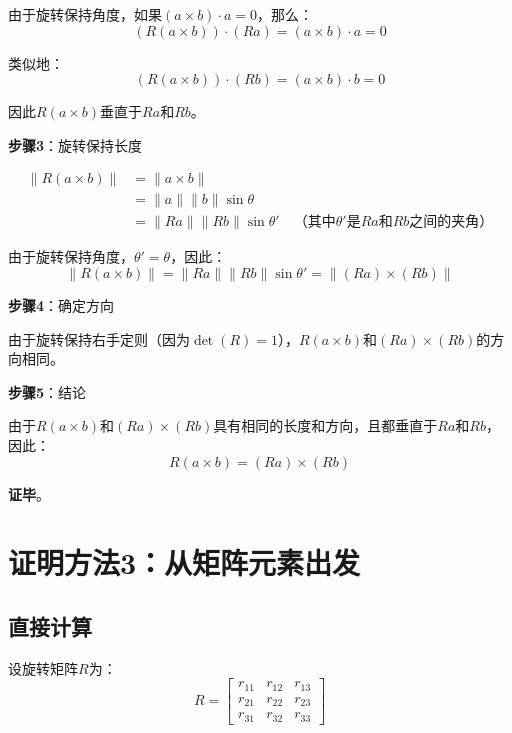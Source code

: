 \documentclass[12pt,a4paper]{article}
\begin{document}
由于旋转保持角度，如果$(a \times b) \cdot a = 0$，那么：
\begin{equation}
(R(a \times b)) \cdot (Ra) = (a \times b) \cdot a = 0
\end{equation}

类似地：
\begin{equation}
(R(a \times b)) \cdot (Rb) = (a \times b) \cdot b = 0
\end{equation}

因此$R(a \times b)$垂直于$Ra$和$Rb$。

\textbf{步骤3}：旋转保持长度

\begin{align}
\|R(a \times b)\| &= \|a \times b\| \\
&= \|a\| \|b\| \sin\theta \\
&= \|Ra\| \|Rb\| \sin\theta' \quad \text{（其中$\theta'$是$Ra$和$Rb$之间的夹角）}
\end{align}

由于旋转保持角度，$\theta' = \theta$，因此：
\begin{equation}
\|R(a \times b)\| = \|Ra\| \|Rb\| \sin\theta' = \|(Ra) \times (Rb)\|
\end{equation}

\textbf{步骤4}：确定方向

由于旋转保持右手定则（因为$\det(R) = 1$），$R(a \times b)$和$(Ra) \times (Rb)$的方向相同。

\textbf{步骤5}：结论

由于$R(a \times b)$和$(Ra) \times (Rb)$具有相同的长度和方向，且都垂直于$Ra$和$Rb$，因此：
\begin{equation}
R(a \times b) = (Ra) \times (Rb)
\end{equation}

\textbf{证毕}。

\section{证明方法3：从矩阵元素出发}

\subsection{直接计算}

设旋转矩阵$R$为：
\begin{equation}
R = \begin{bmatrix}
r_{11} & r_{12} & r_{13} \\
r_{21} & r_{22} & r_{23} \\
r_{31} & r_{32} & r_{33}
\end{bmatrix}
\end{equation}
\end{document}
